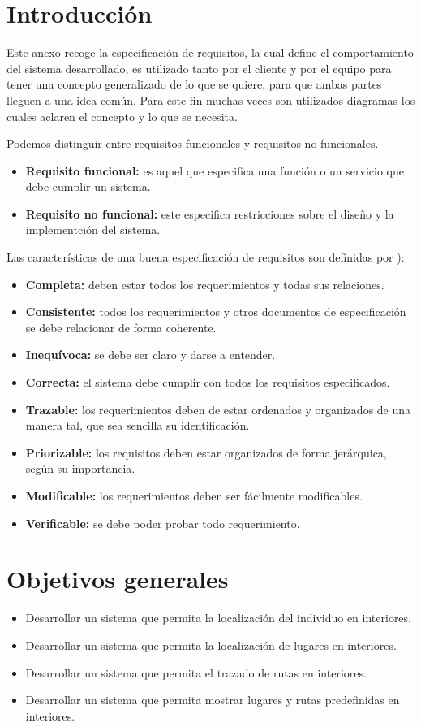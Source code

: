 
\section{Introducción}
Este anexo recoge la especificación de requisitos, la cual define el comportamiento del sistema desarrollado, es utilizado tanto por el cliente y por el equipo para tener una concepto generalizado de lo que se quiere, para que ambas partes lleguen a una idea común. Para este fin muchas veces son utilizados diagramas los cuales aclaren el concepto y lo que se necesita.

Podemos distinguir entre requisitos funcionales y requisitos no funcionales.
\begin{itemize}
\item
\textbf{Requisito funcional:} es aquel que especifica una función o un servicio que debe cumplir un sistema.
\item
\textbf{Requisito no funcional:} este especifica restricciones sobre el diseño y la implementción del sistema.
\end{itemize}

Las características de una buena especificación de requisitos son definidas por \cite{espefreq}):
\begin{itemize}
\item
\textbf{Completa:} deben estar todos los requerimientos y todas sus relaciones.
\item
\textbf{Consistente:} todos los requerimientos y otros documentos de especificación se debe relacionar de forma coherente.
\item
\textbf{Inequívoca:} se debe ser claro y darse a entender.
\item
\textbf{Correcta:} el sistema debe cumplir con todos los requisitos especificados.
\item
\textbf{Trazable:} los requerimientos deben de estar ordenados y organizados de una manera tal, que sea sencilla su identificación.
\item
\textbf{Priorizable:} los requisitos deben estar organizados de forma jerárquica, según su importancia.
\item
\textbf{Modificable:} los requerimientos deben ser fácilmente modificables.
\item
\textbf{Verificable:} se debe poder probar todo requerimiento.
\end{itemize}


\section{Objetivos generales}
\begin{itemize}
\item
Desarrollar un sistema que permita la localización del individuo en interiores.
\item
Desarrollar un sistema que permita la localización de lugares en interiores.
\item
Desarrollar un sistema que permita el trazado de rutas en interiores.
\item
Desarrollar un sistema que permita mostrar lugares y rutas predefinidas en interiores.
\end{itemize}
